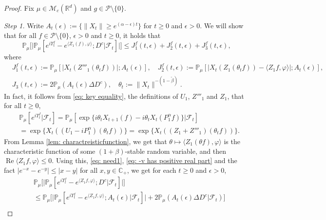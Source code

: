 \documentclass[EJP]{ejpecp} %
\begin{document}
\begin{proof}
	Fix  $\mu \in \mathcal M_c(\mathbb R^d)$ and $g \in \mathcal P\setminus \{0\}$.

	\emph{Step 1.} Write $ A_t(\epsilon) :=\{ \|X_t\| \geq e^{(\alpha - \epsilon)t} \} $ for $t\geq 0$ and $\epsilon > 0$.
	We will show that for all $f\in \mathcal P \setminus \{0\}$, $\epsilon > 0$ and $t\geq 0$, it holds that
\[
   	\mathbb P_\mu \Big[ \big| \mathbb P_\mu [e^{i\Upsilon^f_t} - e^{\langle Z_1(f), \varphi\rangle}; D^c | \mathscr F_t ]\big| \Big]
   	\leq J^f_1(t,\epsilon)+J^f_2(t,\epsilon)+J^f_3(t,\epsilon),
\]
	where
\begin{align}
\label{eq: Def of Ji}
	& J^f_1(t,\epsilon):= \mathbb{P}_{\mu} [ | X_t(Z'''_1(\theta_t f)) |; A_t(\epsilon) ], \quad
	J^f_2(t,\epsilon):= \mathbb{P}_{\mu}[|X_t( Z_1(\theta_t f))-\langle Z_1f, \varphi\rangle |; A_t(\epsilon)], 
	\\ & J_3(t,\epsilon):=2\mathbb{P}_{\mu}(A_t (\epsilon)\Delta D^c), \quad
	\theta_t := \|X_t\|^{-(1 - \tilde \beta)}.
\end{align}
	In fact, it follows from \eqref{eq: key equality}, the definitions of $U_1$, $Z'''_1$ and $Z_1$, that for all $t\geq 0$,
\begin{align}
\label{eq: need1}
	& \mathbb{P}_{\mu}[e^{i\Upsilon^f_t}|\mathscr{F}_t]
    = \mathbb{P}_{\mu}[\exp\{i\theta_t X_{t+1} (f) - i \theta_t X_t(P_1^\alpha f)\} |\mathscr{F}_{t}] \\
	& = \exp\{X_t((U_1 - iP^\alpha_1 ) (\theta_t f))\}
    = \exp\{X_t((Z_1 + Z'''_1) (\theta_t f))\}.
\end{align}
	From Lemma \ref{lem: charactreisticfunction}, we  get that $\theta\mapsto \langle Z_1(\theta f),\varphi\rangle$ is the characteristic function of some $(1+\beta)$-stable random variable, and then  $\operatorname{Re} \langle Z_1f, \varphi\rangle \leq 0$.
	Using this, \eqref{eq: need1}, \eqref{eq: -v has positive real part} and the fact $|e^{-x} - e^{-y}| \leq |x-y|$ for all $x,y \in \mathbb C_+$, we get for each $t\geq 0$ and $\epsilon> 0$,
\begin{align}
\label{eq: inequality that will used later}
	& \mathbb{P}_\mu \Big[ \big|  \mathbb{P}_\mu [ e^{i\Upsilon^f_t} - e^{\langle Z_1f,\varphi \rangle} ; D^c | \mathscr F_{t}]   \big|\Big]  \\
  	& \leq \mathbb{P}_\mu   \Big[ \big|    \mathbb{P}_\mu [ e^{i \Upsilon^f_t }-e^{\langle Z_1f, \varphi\rangle}; A_{t}(\epsilon) | \mathscr F_{t}] \big|  + 2\mathbb P_\mu ( A_{t}(\epsilon) \Delta D^c | \mathscr F_{t}) \Big] \\

\end{align}
\end{proof}
\end{document}
